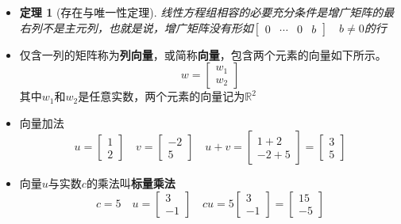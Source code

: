 \documentclass[UTF8]{report}
\newtheorem{theorem}{定理}
\begin{document}
\begin{itemize}
		\item \begin{theorem}[存在与唯一性定理]
			线性方程组相容的必要充分条件是增广矩阵的最右列不是主元列，也就是说，增广矩阵没有形如$\begin{bmatrix} 0 & \cdots & 0 & b \end{bmatrix}\quad b \neq 0$的行
		\end{theorem}
	
		\item 仅含一列的矩阵称为\textbf{列向量}，或简称\textbf{向量}，包含两个元素的向量如下所示。
		\begin{displaymath}
		w=\begin{bmatrix}
		w_1\\
		w_2
		\end{bmatrix}
		\end{displaymath}其中$w_1$和$w_2$是任意实数，两个元素的向量记为$\mathbb{R}^2$
		
		\item 向量加法
		\begin{displaymath}
		u=\begin{bmatrix} 1 \\ 2 \end{bmatrix}\quad v=\begin{bmatrix} -2 \\ 5 \end{bmatrix} \quad u+v= \begin{bmatrix}1+2\\ -2+5 \end{bmatrix}=\begin{bmatrix}
		3 \\ 5\end{bmatrix}
		\end{displaymath}
		
		\item 向量$u$与实数$c$的乘法叫\textbf{标量乘法}
		\begin{displaymath}
		c=5 \quad u=\begin{bmatrix} 3 \\ -1 \end{bmatrix}\quad cu=5\begin{bmatrix} 3 \\-1 \end{bmatrix}=\begin{bmatrix}15 \\ -5 \end{bmatrix}
		\end{displaymath}
		

\end{itemize}
\end{document}
